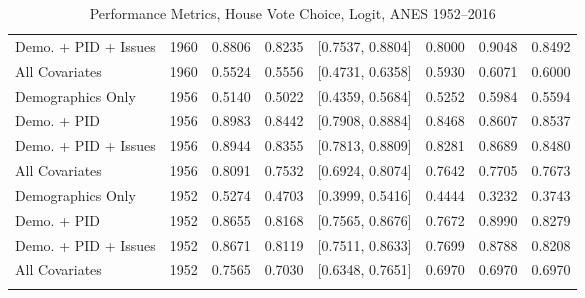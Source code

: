 \begin{longtable}{lrrrlrrr}
  Demo. + PID + Issues & 1960 & 0.8806 & 0.8235 & [0.7537, 0.8804] & 0.8000 & 0.9048 & 0.8492 \\ 
  All Covariates & 1960 & 0.5524 & 0.5556 & [0.4731, 0.6358] & 0.5930 & 0.6071 & 0.6000 \\ 
  Demographics Only & 1956 & 0.5140 & 0.5022 & [0.4359, 0.5684] & 0.5252 & 0.5984 & 0.5594 \\ 
  Demo. + PID & 1956 & 0.8983 & 0.8442 & [0.7908, 0.8884] & 0.8468 & 0.8607 & 0.8537 \\ 
  Demo. + PID + Issues & 1956 & 0.8944 & 0.8355 & [0.7813, 0.8809] & 0.8281 & 0.8689 & 0.8480 \\ 
  All Covariates & 1956 & 0.8091 & 0.7532 & [0.6924, 0.8074] & 0.7642 & 0.7705 & 0.7673 \\ 
  Demographics Only & 1952 & 0.5274 & 0.4703 & [0.3999, 0.5416] & 0.4444 & 0.3232 & 0.3743 \\ 
  Demo. + PID & 1952 & 0.8655 & 0.8168 & [0.7565, 0.8676] & 0.7672 & 0.8990 & 0.8279 \\ 
  Demo. + PID + Issues & 1952 & 0.8671 & 0.8119 & [0.7511, 0.8633] & 0.7699 & 0.8788 & 0.8208 \\ 
  All Covariates & 1952 & 0.7565 & 0.7030 & [0.6348, 0.7651] & 0.6970 & 0.6970 & 0.6970 \\ 
   \bottomrule
\caption{Performance Metrics, House Vote Choice, Logit, ANES 1952--2016} 
\label{tab:ANES_house_logit}
\end{longtable}
